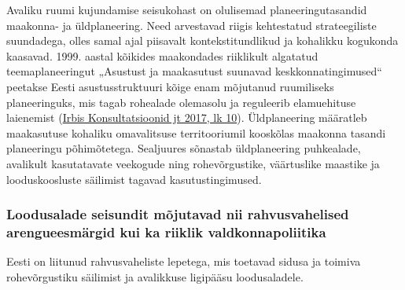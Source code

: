\documentclass[estonian,]{article}
\begin{document}
Avaliku ruumi kujundamise seisukohast on olulisemad planeeringutasandid maakonna- ja üldplaneering. Need arvestavad riigis kehtestatud strateegiliste suundadega, olles samal ajal piisavalt kontekstitundlikud ja kohalikku kogukonda kaasavad. 1999. aastal kõikides maakondades riiklikult algatatud teemaplaneeringut „Asustust ja maakasutust suunavad keskkonnatingimused`` peetakse Eesti asustusstruktuuri kõige enam mõjutanud ruumiliseks planeeringuks, mis tagab rohealade olemasolu ja reguleerib elamuehituse laienemist (\protect\hyperlink{Irbis2017}{Irbis Konsultatsioonid jt 2017, lk 10}). Üldplaneering määratleb maakasutuse kohaliku omavalitsuse territooriumil kooskõlas maakonna tasandi planeeringu põhimõtetega. Sealjuures sõnastab üldplaneering puhkealade, avalikult kasutatavate veekogude ning rohevõrgustike, väärtuslike maastike ja looduskoosluste säilimist tagavad kasutustingimused.

\hypertarget{loodusalade-seisundit-muxf5jutavad-nii-rahvusvahelised-arengueesmuxe4rgid-kui-ka-riiklik-valdkonnapoliitika}{%
\subsubsection*{Loodusalade seisundit mõjutavad nii rahvusvahelised arengueesmärgid kui ka riiklik valdkonnapoliitika}\label{loodusalade-seisundit-muxf5jutavad-nii-rahvusvahelised-arengueesmuxe4rgid-kui-ka-riiklik-valdkonnapoliitika}}

\begin{blockquote-right}
Eesti on liitunud rahvusvaheliste lepetega, mis toetavad sidusa ja
toimiva rohevõrgustiku säilimist ja avalikkuse ligipääsu loodusaladele.
\end{blockquote-right}
\end{document}
